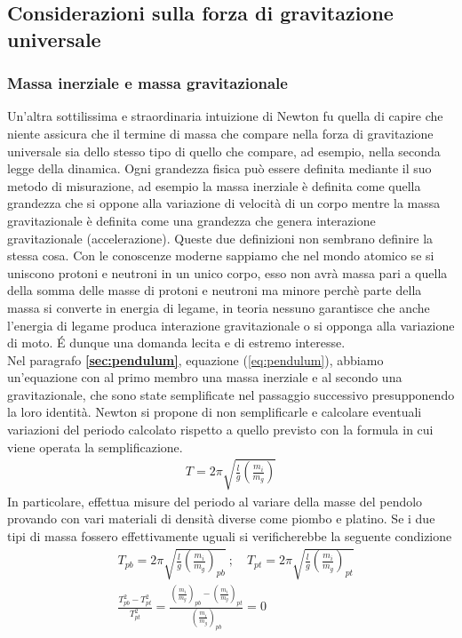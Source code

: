 \subsection{Considerazioni sulla forza di gravitazione universale}
\subsubsection{Massa inerziale e massa gravitazionale}
 Un'altra sottilissima e straordinaria intuizione di Newton fu quella di capire che niente assicura che il termine di massa che compare nella forza di gravitazione universale sia dello stesso tipo di quello che compare, ad esempio, nella seconda legge della dinamica. Ogni grandezza fisica può essere definita mediante il suo metodo di misurazione, ad esempio la massa inerziale è definita come quella grandezza che si oppone alla variazione di velocità di un corpo mentre la massa gravitazionale è definita come una grandezza che genera interazione gravitazionale (accelerazione). Queste due definizioni non sembrano definire la stessa cosa. Con le conoscenze moderne sappiamo che nel mondo atomico se si uniscono protoni e neutroni in un unico corpo, esso non avrà massa pari a quella della somma delle masse di protoni e neutroni ma minore perchè parte della massa si converte in energia di legame, in teoria nessuno garantisce che anche l'energia di legame produca interazione gravitazionale o si opponga alla variazione di moto. \'{E} dunque una domanda lecita e di estremo interesse.\\
 Nel paragrafo \textbf{\ref{sec:pendulum}}, equazione (\ref{eq:pendulum}), abbiamo un'equazione con al primo membro una massa inerziale e al secondo una gravitazionale, che sono state semplificate nel passaggio successivo presupponendo la loro identità. Newton si propone di non semplificarle e calcolare eventuali variazioni del periodo calcolato rispetto a quello previsto con la formula in cui viene operata la semplificazione.
 \begin{align*}
  T = 2\pi \sqrt{\frac{l}{g} (\frac{m_i}{m_g})}
 \end{align*}
In particolare, effettua misure del periodo al variare della masse del pendolo provando con vari materiali di densità diverse come piombo e platino. Se i due tipi di massa fossero effettivamente uguali si verificherebbe la seguente condizione
\begin{align*}
	 &T_{pb} = 2\pi \sqrt{\frac{l}{g} (\frac{m_i}{m_g})_{pb}}\ ; \quad  T_{pt} = 2\pi \sqrt{\frac{l}{g} (\frac{m_i}{m_g})_{pt}}\\
	 &\frac{T_{pb}^2-T_{pt}^2}{T_{pt}^2}=\frac{(\frac{m_i}{m_g})_{pb}-(\frac{m_i}{m_g})_{pt}}{(\frac{m_i}{m_g})_{pb}}=0
\end{align*}

